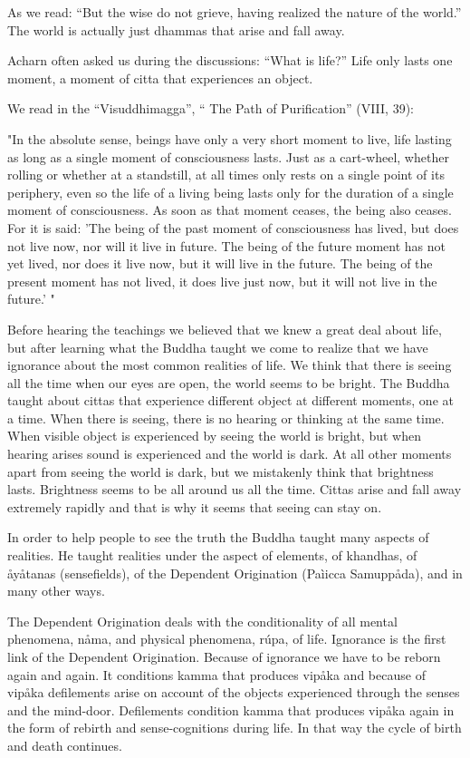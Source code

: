 \documentclass[10pt,a4paper,final]{article}
\begin{document}
As we read:
``But the wise do not
grieve, having realized the nature of
the world.'' The world is actually just dhammas that arise
and fall away. 

Acharn often asked us during the
discussions: ``What is life?'' Life only lasts one moment, a moment of
citta that experiences an object.

We read in the ``Visuddhimagga'', `` The
Path of Purification'' (VIII, 39): 

"In the absolute sense,
beings have only a very short moment to live, life lasting as long as a
single moment of consciousness lasts. Just as a cart-wheel, whether
rolling or whether at a standstill, at all times only rests on a single
point of its periphery, even so the life of a living being lasts only
for the duration of a single moment of consciousness. As soon as that
moment ceases, the being also ceases. For it is said: 'The being of the
past moment of consciousness has lived, but does not live now, nor will
it live in future. The being of the future moment has not yet lived, nor
does it live now, but it will live in the future. The being of the
present moment has not lived, it does live just now, but it will not
live in the future.' "

Before hearing the teachings we believed
that we knew a great deal about life, but after learning what the Buddha
taught we come to realize that we have ignorance about the most common
realities of life. We think that there is seeing all the time when our
eyes are open, the world seems to be bright. The Buddha taught about
cittas that experience different object at different moments, one at a
time. When there is seeing, there is no hearing or thinking at the same
time. When visible object is experienced by seeing the world is bright,
but when hearing arises sound is experienced and the world is dark. At
all other moments apart from seeing the world is dark, but we mistakenly
think that brightness lasts. Brightness seems to be all around us all
the time. Cittas arise and fall away extremely rapidly and that is why
it seems that seeing can stay on. 

In order to help people to see the truth the
Buddha taught many aspects of realities. He taught realities under the
aspect of elements, of khandhas, of åyåtanas (sensefields), of the
Dependent Origination (Paìicca Samuppåda), and in many other ways. 

The Dependent Origination deals with the
conditionality of all mental phenomena, nåma, and physical phenomena,
rúpa, of life. Ignorance is the first link of the Dependent Origination.
Because of ignorance we have to be reborn again and again. It conditions
kamma that produces vipåka and because of vipåka defilements arise on
account of the objects experienced through the senses and the mind-door.
Defilements condition kamma that produces vipåka again in the form of
rebirth and sense-cognitions during life. In that way the cycle of birth
and death continues. 
\end{document}
